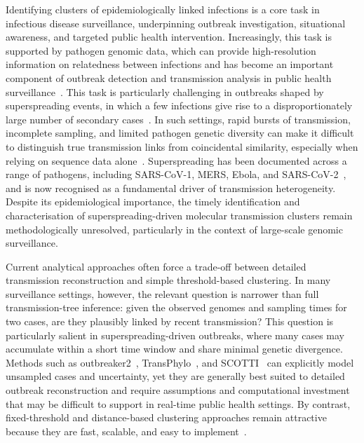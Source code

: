 \documentclass[10pt,letterpaper]{article}
\begin{document}
Identifying clusters of epidemiologically linked infections is a core task in infectious disease surveillance, underpinning outbreak investigation, situational awareness, and targeted public health intervention. Increasingly, this task is supported by pathogen genomic data, which can provide high-resolution information on relatedness between infections and has become an important component of outbreak detection and transmission analysis in public health surveillance~\cite{Armstrong2019, Struelens2024}. This task is particularly challenging in outbreaks shaped by superspreading events, in which a few infections give rise to a disproportionately large number of secondary cases~\cite{LloydSmith2005}. In such settings, rapid bursts of transmission, incomplete sampling, and limited pathogen genetic diversity can make it difficult to distinguish true transmission links from coincidental similarity, especially when relying on sequence data alone~\cite{Valesano2021, Bendall2022}. Superspreading has been documented across a range of pathogens, including SARS-CoV-1, MERS, Ebola, and SARS-CoV-2~\cite{Shen2004, Lau2017, Cho2016, Lee2020, McKee2024}, and is now recognised as a fundamental driver of transmission heterogeneity. Despite its epidemiological importance, the timely identification and characterisation of superspreading-driven molecular transmission clusters remain methodologically unresolved, particularly in the context of large-scale genomic surveillance.

Current analytical approaches often force a trade-off between detailed transmission reconstruction and simple threshold-based clustering. In many surveillance settings, however, the relevant question is narrower than full transmission-tree inference: given the observed genomes and sampling times for two cases, are they plausibly linked by recent transmission? This question is particularly salient in superspreading-driven outbreaks, where many cases may accumulate within a short time window and share minimal genetic divergence. Methods such as outbreaker2~\cite{Campbell2018b, Jombart2014}, TransPhylo~\cite{Didelot2017}, and SCOTTI~\cite{DeMaio2016} can explicitly model unsampled cases and uncertainty, yet they are generally best suited to detailed outbreak reconstruction and require assumptions and computational investment that may be difficult to support in real-time public health settings. By contrast, fixed-threshold and distance-based clustering approaches remain attractive because they are fast, scalable, and easy to implement~\cite{Stimson2019, Poon2016, Campbell2018a, Illingworth2022, Sobkowiak2022, Sobkowiak2023}.
\end{document}
